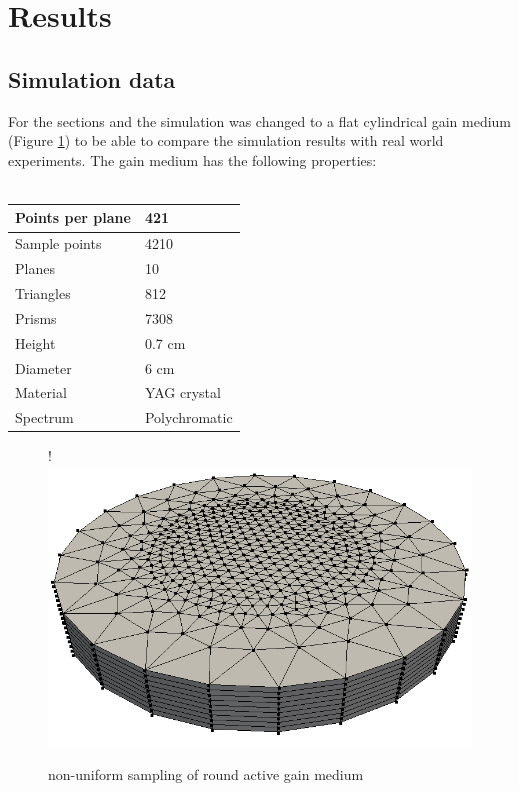 \section{Results}

\subsection{Simulation data}
For the sections  and  
the simulation was changed to a flat 
cylindrical gain medium (Figure \ref{graphic:samples_round}) to be able to compare the simulation results with real world experiments. The gain medium has the following
properties:
\\
\\ 
\begin{tabular}{| l | l |}
\hline
Points per plane        & 421\\
\hline
Sample points           & 4210\\
\hline
Planes                  & 10\\
\hline
Triangles               & 812\\
\hline
Prisms                  & 7308\\
\hline
Height                  & 0.7 cm\\
\hline
Diameter                & 6 cm\\
\hline
Material                & YAG crystal\\
\hline
Spectrum                & Polychromatic\\
\hline
\end{tabular}

\begin{figure}[H]
  \centerline{
     {!} {\includegraphics{graphics/samples_round.png}}
  }
  \caption{non-uniform sampling of round active gain medium}
  \label{graphic:samples_round}
\end{figure}


